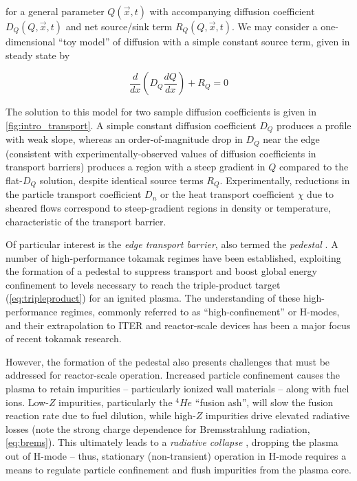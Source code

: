 \noindent for a general parameter $Q(\vec{x},t)$ with accompanying diffusion coefficient $D_Q(Q,\vec{x},t)$ and net source/sink term $R_Q(Q,\vec{x},t)$.  We may consider a one-dimensional ``toy model'' of diffusion with a simple constant source term, given in steady state by

\begin{equation}\label{eq:diffusion2}
 \frac{d}{dx} \left( D_Q \frac{dQ}{dx} \right) + R_Q = 0
\end{equation}

\noindent The solution to this model for two sample diffusion coefficients is given in \cref{fig:intro_transport}.  A simple constant diffusion coefficient $D_Q$ produces a profile with weak slope, whereas an order-of-magnitude drop in $D_Q$ near the edge (consistent with experimentally-observed values of diffusion coefficients in transport barriers) produces a region with a steep gradient in $Q$ compared to the flat-$D_Q$ solution, despite identical source terms $R_Q$.  Experimentally, reductions in the particle transport coefficient $D_n$ or the heat transport coefficient $\chi$ due to sheared flows correspond to steep-gradient regions in density or temperature, characteristic of the transport barrier.

Of particular interest is the \emph{edge transport barrier}, also termed the \emph{pedestal} \cite{Wagner1982,Greenwald1997}.  A number of high-performance tokamak regimes have been established, exploiting the formation of a pedestal to suppress transport and boost global energy confinement to levels necessary to reach the triple-product target (\cref{eq:tripleproduct}) for an ignited plasma.  The understanding of these high-performance regimes, commonly referred to as ``high-confinement'' or H-modes, and their extrapolation to ITER and reactor-scale devices has been a major focus of recent tokamak research.

However, the formation of the pedestal also presents challenges that must be addressed for reactor-scale operation.  Increased particle confinement causes the plasma to retain impurities -- particularly ionized wall materials -- along with fuel ions.  Low-$Z$ impurities, particularly the ${}^4\si{He}$ ``fusion ash'', will slow the fusion reaction rate due to fuel dilution, while high-$Z$ impurities drive elevated radiative losses (note the strong charge dependence for Bremsstrahlung radiation, \cref{eq:brems}).  This ultimately leads to a \emph{radiative collapse} \cite{Greenwald1997,Greenwald2007}, dropping the plasma out of H-mode -- thus, stationary (\ie non-transient) operation in H-mode requires a means to regulate particle confinement and flush impurities from the plasma core.  


